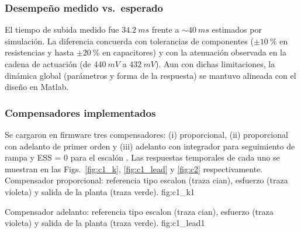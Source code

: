 \subsubsection{Desempeño medido vs.\ esperado}
El tiempo de subida medido fue \(\SI{34.2}{ms}\) frente a \(\sim\SI{40}{ms}\) estimados por simulación. La diferencia concuerda con tolerancias de componentes (\(\pm\SI{10}{\percent}\) en resistencias y hasta \(\pm\SI{20}{\percent}\) en capacitores) y con la atenuación observada en la cadena de actuación (de \(\SI{440}{mV}\) a \(\SI{432}{mV}\)). Aun con dichas limitaciones, la dinámica global (parámetros y forma de la respuesta) se mantuvo alineada con el diseño en Matlab.

\subsubsection{Compensadores implementados}
Se cargaron en firmware tres compensadores: (i) proporcional, (ii) proporcional con adelanto de primer orden y (iii) adelanto con integrador para seguimiento de rampa y ESS = 0 para el escalón . Las respuestas temporales de cada uno se muestran en las Figs.~\ref{fig:c1_k}, \ref{fig:c1_lead} y \ref{fig:c2} respectivamente.
{Compensador proporcional: referencia tipo escalon (traza cian), esfuerzo (traza violeta) y salida de la planta (traza verde).}
{fig:c1_k}{1}

{Compensador adelanto: referencia tipo escalon (traza cian), esfuerzo (traza violeta) y salida de la planta (traza verde).}
{fig:c1_lead}{1}
                                                            
                                                                                                                                                                                                      
